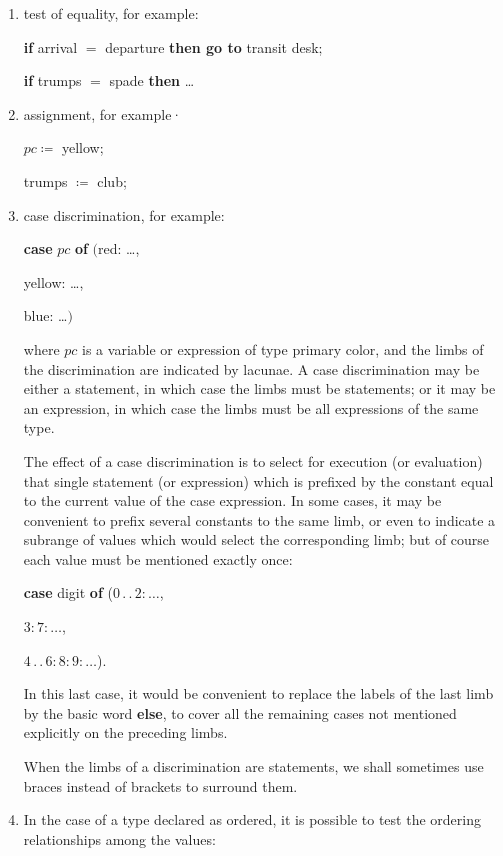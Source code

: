 \documentclass[twoside,11pt]{book}
\begin{document}
\begin{enumerate}[wide, nosep, label=(\arabic*)]
	\item test of equality, for example:

	\quad \textbf{if} arrival $=$ departure \textbf{then go to} transit desk;

	\quad \textbf{if} trumps $=$ spade \textbf{then} \dots

	\item assignment, for example·

	\quad $pc \coloneq$ yellow;

	\quad trumps $\coloneq$ club;

	\item \label{en:manipulation-3}
	case discrimination, for example:

	\quad \textbf{case} $pc$ \textbf{of} $($red: \dots,

	\tabto{5.7em}yellow: \dots,

	\tabto{5.7em}blue: \dots$)$
	
	\noindent
	where $pc$ is a variable or expression of type primary color, and the limbs of the discrimination are indicated by lacunae. A case discrimination may be either a statement, in which case the limbs must be statements; or it may be an expression, in which case the limbs must be all expressions of the same type.
	
	The effect of a case discrimination is to select for execution (or evaluation) that single statement (or expression) which is prefixed by the constant equal to the current value of the case expression. In some cases, it may be convenient to prefix several constants to the same limb, or even to indicate a subrange of values which would select the corresponding limb; but of course each value must be mentioned exactly once:
	
	\quad \textbf{case} digit \textbf{of} ($0\,.\,.\,2:\dots$,
	
	\tabto{6.6em}$3:7:\dots$,
	
	\tabto{6.6em}$4\,.\,.\,6:8:9:\dots$).
	
	\noindent
	In this last case, it would be convenient to replace the labels of the last limb by the basic word \textbf{else}, to cover all the remaining cases not mentioned explicitly on the preceding limbs.
	
	When the limbs of a discrimination are statements, we shall sometimes use braces instead of brackets to surround them.
	
	\item In the case of a type declared as ordered, it is possible to test the ordering relationships among the values:
	

\end{enumerate}
\end{document}
